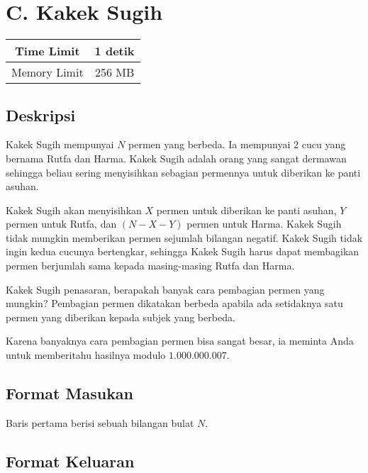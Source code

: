 \documentclass{article}
\begin{document}
\section*{\hfil C. Kakek Sugih\hfil}

\begin{center}
\begin{tabular}{ |cc| } 
 \hline
 Time Limit & 1 detik \\ 
 \hline
 Memory Limit & 256 MB \\
 \hline
\end{tabular}
\end{center}

\subsection*{Deskripsi}

\par\indent Kakek Sugih mempunyai $N$ permen yang berbeda. Ia mempunyai 2 cucu yang bernama Rutfa dan Harma. Kakek Sugih adalah orang yang sangat dermawan sehingga beliau sering menyisihkan sebagian permennya untuk diberikan ke panti asuhan. 

\par Kakek Sugih akan menyisihkan $X$ permen untuk diberikan ke panti asuhan, $Y$ permen untuk Rutfa, dan $(N - X - Y)$ permen untuk Harma. Kakek Sugih tidak mungkin memberikan permen sejumlah bilangan negatif. Kakek Sugih tidak ingin kedua cucunya bertengkar, sehingga Kakek Sugih harus dapat membagikan permen berjumlah sama kepada masing-masing Rutfa dan Harma.

\par Kakek Sugih penasaran, berapakah banyak cara pembagian permen yang mungkin? Pembagian permen dikatakan berbeda apabila ada setidaknya satu permen yang diberikan kepada subjek yang berbeda. 

\par Karena banyaknya cara pembagian permen bisa sangat besar, ia meminta Anda untuk memberitahu hasilnya modulo $1.000.000.007$.

\subsection*{Format Masukan}
\par\noindent Baris pertama berisi sebuah bilangan bulat $N$.

\subsection*{Format Keluaran}
\end{document}
